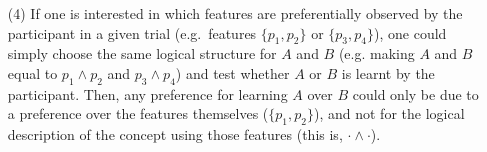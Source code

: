 \begin{enumerate}
\item [(4)] If one is interested in which features are preferentially observed by the participant in a given trial (e.g.\  features $\{p_1,p_2\}$ or $\{p_3,p_4\}$), one could simply choose the same logical structure for $A$ and $B$ (e.g. making $A$ and $B$ equal to $p_1 \land p_2$ and $p_3 \land p_4$) and test whether $A$ or $B$ is learnt by the participant. Then, any preference for learning $A$ over $B$ could only be due to a preference over the features themselves ($\{p_1,p_2\}$), and not for the logical description of the concept using those features (this is, $\boldsymbol{\cdot} \land \boldsymbol{\cdot}$).
\end{enumerate}

